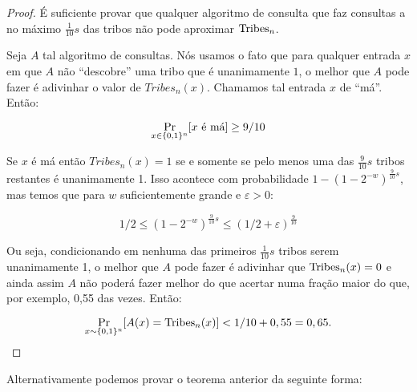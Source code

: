 \begin{proof}

É suficiente provar que qualquer algoritmo de consulta que faz consultas a no máximo $\frac{1}{10}s$ das tribos não pode aproximar $\text{Tribes}_{n}$.

Seja $A$ tal algoritmo de consultas. Nós usamos o fato que para qualquer entrada $x$ em que $A$ não ``descobre'' uma tribo que é unanimamente $1$, o melhor que $A$ pode fazer é adivinhar o valor de $Tribes_{n}(x)$. Chamamos tal entrada $x$ de ``má''. Então:

\begin{equation*}
    \Pr_{x \in \{0, 1\}^{n}}[x \text{ é má}] \geq 9/10
\end{equation*}

Se $x$ é má então $Tribes_{n}(x) = 1$ se e somente se pelo menos uma das $\frac{9}{10}s$ tribos restantes é unanimamente 1. Isso acontece com probabilidade $1 - (1 - 2^{-w})^{\frac{9}{10}s}$, mas temos que para $w$ suficientemente grande e $\varepsilon > 0$:

\begin{equation*}
    1/2 \leq (1 - 2^{-w})^{\frac{9}{10}s} \leq (1/2 + \varepsilon)^{\frac{9}{10}}
\end{equation*}

 Ou seja, condicionando em nenhuma das primeiros $\frac{1}{10}s$ tribos serem unanimamente 1, o melhor que $A$ pode fazer é adivinhar que $\text{Tribes}_{n}(x) = 0$ e ainda assim $A$ não poderá fazer melhor do que acertar numa fração maior do que, por exemplo, 0,55 das vezes. Então:

\begin{equation*}
	\Pr_{x \sim \{0, 1\}^{n}}[A(x) = \text{Tribes}_{n}(x)] < 1/10 + 0,55 = 0,65.
\end{equation*}

\end{proof}

\color{red} Alternativamente podemos provar o teorema anterior da seguinte forma:

